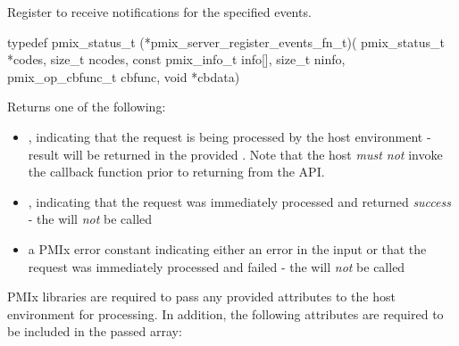 Register to receive notifications for the specified events.

\format

\cspecificstart
\begin{codepar}
 typedef pmix_status_t (*pmix_server_register_events_fn_t)(
                              pmix_status_t *codes,
                              size_t ncodes,
                              const pmix_info_t info[],
                              size_t ninfo,
                              pmix_op_cbfunc_t cbfunc,
                              void *cbdata)
\end{codepar}
\cspecificend

\begin{arglist}
\end{arglist}

Returns one of the following:

\begin{itemize}
    \item {}, indicating that the request is being processed by the host environment - result will be returned in the provided . Note that the host \emph{must not} invoke the callback function prior to returning from the \ac{API}.
    \item {}, indicating that the request was immediately processed and returned \textit{success} - the  will \textit{not} be called
    \item a PMIx error constant indicating either an error in the input or that the request was immediately processed and failed - the  will \textit{not} be called
\end{itemize}

\reqattrstart
\ac{PMIx} libraries are required to pass any provided attributes to the host environment for processing. In addition, the following attributes are required to be included in the passed  array:


